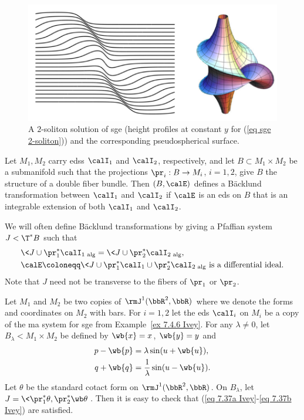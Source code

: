 \begin{figure}[tp]
    \centering
    \includegraphics[scale=0.2]{figures/SG2soliton.png}
    \caption{A $2$-soliton solution of \gls{sge} (height profiles at constant $y$ for (\ref{eq sge 2-soliton})) and the corresponding pseudospherical surface.}
    \label{fig:2-soliton}
\end{figure}


\begin{defn}
    Let $M_1,M_2$ carry \glspl{eds} $\calI_1$ and $\calI_2$, respectively, and let $B\subset M_1\times M_2$ be a submanifold such that the projections $\pr_i:B\to M_i$, $i=1,2$, give $B$ the structure of a double fiber bundle. Then $(B,\calE)$ defines a B\"acklund transformation between $\calI_1$ and $\calI_2$ if $\calE$ is an \gls{eds} on $B$ that is an integrable extension of both $\calI_1$ and $\calI_2$.
\end{defn}

We will often define B\"acklund transformations by giving a Pfaffian system $J<\T^\ast B$ such that 
\begin{align}
    &\<J\cup \pr_1^\ast \calI_1\>_{\mathrm{alg}}=\<J\cup \pr_2^\ast\calI_2\>_{\mathrm{alg}},\label{eq 7.37a Ivey}\\
    &\calE\coloneqq \<J\cup \pr_1^\ast \calI_1\cup \pr_2^\ast \calI_2\>_{\mathrm{alg}}\text{ is a differential ideal}.\label{eq 7.37b Ivey}
\end{align}
Note that $J$ need not be transverse to the fibers of $\pr_1$ or $\pr_2$.

\begin{example}
    Let $M_1$ and $M_2$ be two copies of $\rmJ^1(\bbR^2,\bbR)$ where we denote the forms and coordinates on $M_2$ with bars. For $i=1,2$ let the \gls{eds} $\calI_i$ on $M_i$ be a copy of the \gls{ma} system for \gls{sge} from Example~\ref{ex 7.4.6 Ivey}. For any $\lambda\neq 0$, let $B_\lambda<M_1\times M_2$ be defined by $\wb{x}=x$, $\wb{y}=y$ and 
    \begin{align}
        p-\wb{p}&=\lambda\sin(u+\wb{u}),\\
        q+\wb{q}&=\frac{1}{\lambda}\sin(u-\wb{u}).
    \end{align}
    Let $\theta$ be the standard cotact form on $\rmJ^1(\bbR^2,\bbR)$. On $B_\lambda$, let $J=\<\pr_1^\ast\theta,\pr_2^\ast\wb\theta\>$. Then it is easy to check that (\ref{eq 7.37a Ivey}-\ref{eq 7.37b Ivey}) are satisfied.
\end{example}

